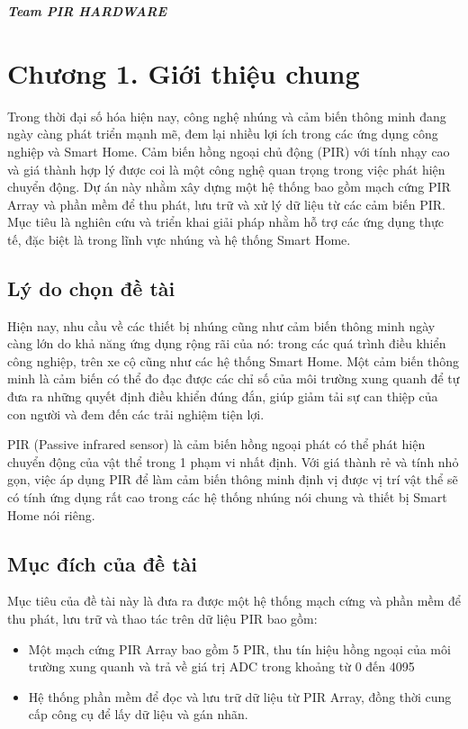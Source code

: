 \documentclass{article}
\begin{document}
\hspace*{\fill}\textit{\textbf{\fontsize{14pt}{0pt}\selectfont Team PIR HARDWARE}}

\cleardoublepage
{}
\tableofcontents %
\thispagestyle{empty}

\cleardoublepage
\section*{Chương 1. Giới thiệu chung}
\setcounter{section}{1}
Trong thời đại số hóa hiện nay, công nghệ nhúng và cảm biến thông minh đang ngày càng phát triển mạnh mẽ, đem lại nhiều lợi ích trong các ứng dụng công nghiệp và Smart Home. Cảm biến hồng ngoại chủ động (PIR) với tính nhạy cao và giá thành hợp lý được coi là một công nghệ quan trọng trong việc phát hiện chuyển động. Dự án này nhằm xây dựng một hệ thống bao gồm mạch cứng PIR Array và phần mềm để thu phát, lưu trữ và xử lý dữ liệu từ các cảm biến PIR. Mục tiêu là nghiên cứu và triển khai giải pháp nhằm hỗ trợ các ứng dụng thực tế, đặc biệt là trong lĩnh vực nhúng và hệ thống Smart Home.
\subsection{Lý do chọn đề tài }
Hiện nay, nhu cầu về các thiết bị nhúng cũng như cảm biến thông minh ngày càng lớn do khả năng ứng dụng rộng rãi của nó: trong các quá trình điều khiển công nghiệp, trên xe cộ cũng như các hệ thống Smart Home. Một cảm biến thông minh là cảm biến có thể đo đạc được các chỉ số của môi trường xung quanh để tự đưa ra những quyết định điều khiển đúng đắn, giúp giảm tải sự can thiệp của con người và đem đến các trải nghiệm tiện lợi. 

PIR (Passive infrared sensor) là cảm biến hồng ngoại phát có thể phát hiện chuyển động của vật thể trong 1 phạm vi nhất định. Với giá thành rẻ và tính nhỏ gọn, việc áp dụng PIR để làm cảm biến thông minh định vị được vị trí vật thể sẽ có tính ứng dụng rất cao trong các hệ thống nhúng nói chung và thiết bị Smart Home nói riêng. 
\subsection{Mục đích của đề tài}
Mục tiêu của đề tài này là đưa ra được một hệ thống mạch cứng và phần mềm để thu phát, lưu trữ và thao tác trên dữ liệu PIR bao gồm: 
\begin{itemize}
    \item Một mạch cứng PIR Array bao gồm 5 PIR, thu tín hiệu hồng ngoại của môi trường xung quanh và trả về giá trị ADC trong khoảng từ 0 đến 4095
    \item Hệ thống phần mềm để đọc và lưu trữ dữ liệu từ PIR Array, đồng thời cung cấp công cụ để lấy dữ liệu và gán nhãn. 
\end{itemize}
\end{document}
